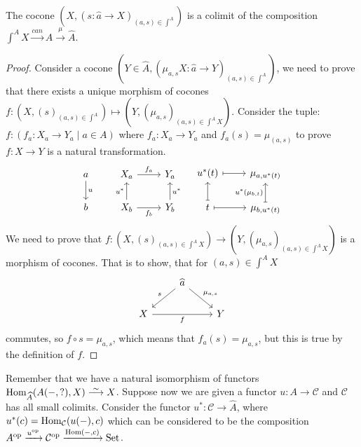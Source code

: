 \begin{prop}
    The cocone $(X, (s\colon \widehat{a} \to X)_ {(a,s)\in \int^A})$ is a colimit of the composition $\int^A X \xrightarrow{ can } A \xrightarrow{\mu}\widehat{A}$.
\end{prop}

\begin{proof}
    Consider a cocone $(Y \in \widehat{A} , (\mu_{a,s} X \colon \widehat{a} \to Y)_{(a,s) \in \int^A})$, we need to prove that there exists a unique morphism of  cocones $f \colon (X, (s)_{(a,s) \in \int^A}) \mapsto (Y, (\mu_{a,s})_{(a,s) \in \int^A X})$.
    Consider the tuple:
    $f \colon (f_a \colon X_a \to Y_a \mid a  \in A)$ where $f_a\colon X_a \to Y_a$ and $f_a(s)=\mu_{(a,s)}$ to prove $f:X \to Y$ is a natural transformation.
    \[
    \begin{tikzcd}
        a 
        \ar[d, "u"]
        &
        X_a
        \ar[r, "f_a"]
        &
        Y_a
        \\
        b
        &
        X_b
        \ar[r, "f_b"']
        \ar[u, "u^*"]
        &
        Y_b
        \ar[u, "u^*"']
    \end{tikzcd}
    \quad
    \begin{tikzcd}
        u^*(t)
        \ar[r, mapsto]
        &
        \mu_{a, u^*(t)}
        \\
        t
        \ar[u, mapsto]
        \ar[r, mapsto]
        &
        \mu_{b, u^*(t)}
        \ar[u, mapsto, "u^*(\mu_{b,t})"]
    \end{tikzcd}
    \]
    We need to prove that $f \colon (X, (s)_{(a,s) \in \int^A X}) \to (Y,(\mu_{a,s})_{(a,s) \in \int^A X})$ is a morphism of cocones.
    That is to show, that for $(a,s) \in \int^AX$ 
    \[
    \begin{tikzcd}
        &
        \widehat{a}
        \ar[rd,"{\mu_{a,s}}"]
        \ar[ld, "s"']
        \\
        X
        \ar[rr,"f"']
        &&
        Y
    \end{tikzcd}
    \] commutes, so $f \circ s = \mu_{a,s}$, which means that $f_a(s)=\mu_{a,s}$, but this is true by the definition of $f$.
\end{proof}

Remember that we have a natural isomorphism of functors $\Hom_{\widehat{A}}(A(-,?),X) \isomorphism X$. 
Suppose now we are given a functor $u \colon A  \to \mathcal{C}$ and $ \mathcal{ C } $ has all small colimits.
Consider the functor $u^*\colon \mathcal{C} \to \widehat{A}$, where $u^*(c) = \operatorname{Hom}_{\mathcal{C}}(u(-),c)$ which can be considered to be the composition $A^{\operatorname{op}} \xrightarrow{u^{\operatorname{op}}} \mathcal{C}^{\operatorname{op}} \xrightarrow{\operatorname{Hom}(-,c)}\operatorname{Set}$.


